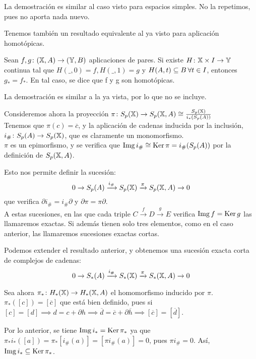 La demostración es similar al caso visto para espacios simples. No la repetimos, pues no aporta nada nuevo.

Tenemos también un resultado equivalente al ya visto para aplicación homotópicas.

\begin{proposition}
  Sean $f, g \colon ({\mathbb X}, A) \to ({\mathbb Y}, B)$ aplicaciones de pares. Si existe $H \colon {\mathbb X} \times I \to {\mathbb Y}$ continua tal que
  $H(\_, 0) = f, H(\_, 1) = g$ y $H(A, t) \subseteq B \hspace{0.2em} \forall t \in I$, entonces $g_* = f_*$. En tal caso, se dice que
  f y g son homotópicas.
\end{proposition}

La demostración es similar a la ya vista, por lo que no se incluye.

Consideremos ahora la proyección $\pi \colon S_{p}({\mathbb X}) \to S_p({\mathbb X}, A) \cong \frac{S_{p}({\mathbb X})}{i_*(S_p(A))}$ \\
Tenemos que $\pi(c) = \overline{c}$, y la aplicación de cadenas inducida por la inclusión, \\
$i_\# \colon S_p(A) \to S_{p}({\mathbb X})$, que es claramente un monomorfismo. \\
$\pi$ es un epimorfismo, y se verifica que $\operatorname{Img} i_\# \cong \operatorname{Ker} \pi = i_\#(S_p(A))$ por la definición de $S_p({\mathbb X}, A)$.

Esto nos permite definir la sucesión:
\[0 \to S_p(A) \xrightarrow{i_\#} S_{p}({\mathbb X}) \xrightarrow{\pi} S_p({\mathbb X}, A) \to 0 \]
que verifica $\partial i_\# = i_\# \partial$ y $\partial \pi = \pi \partial$. \\
A estas sucesiones, en las que cada triple $C \xrightarrow{f} D \xrightarrow{g} E$ verifica $\operatorname{Img} f = \operatorname{Ker} g$ las llamaremos exactas.
Si además tienen solo tres elementos, como en el caso anterior, las llamaremos sucesiones exactas cortas.

Podemos extender el resultado anterior, y obtenemos una sucesión exacta corta de complejos de cadenas:
\[0 \to S_*(A) \xrightarrow{i_\#} S_*({\mathbb X}) \xrightarrow{\pi} S_*({\mathbb X}, A) \to 0 \]

Sea ahora $\pi_* \colon H_*({\mathbb X}) \to H_*({\mathbb X}, A)$ el homomorfismo inducido por $\pi$. \\
$\pi_*([c]) = [\overline{c}]$ que está bien definido, pues si $[c] = [d] \implies d = c + \partial h \implies \overline{d} = \overline{c} + \partial \overline{h}
\implies [\overline{c}] = [\overline{d}]$.

Por lo anterior, se tiene $\operatorname{Img} i_* = \operatorname{Ker} \pi_*$ ya que $\pi_* i_* ([a]) = \pi_*[i_\#(a)] = [\pi i_\#(a)] = 0$, pues $\pi i_\# = 0$. Así, $\operatorname{Img} i_* \subseteq \operatorname{Ker} \pi_*$.

